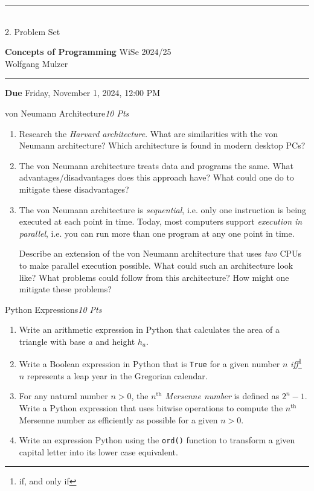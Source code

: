 \documentclass[a4paper,twoside,12pt]{article}
\newcommand{\ZETTELNUMMER}{2}
\newcommand{\ABGABEDATUM}{Friday, November 1, 2024, 12:00 PM}
\newcounter{AUFGNR}
\newcommand{\AUFGABE}[2]{\vspace{0.3cm}\item[Problem \arabic{AUFGNR}]\stepcounter{AUFGNR} #1\hfill\emph{#2}}
\begin{document}
\pagestyle{empty}
\hrule\medskip
\rule{0ex}{0ex}\\[-1ex]
\ZETTELNUMMER. Problem Set

\smallskip
\noindent
\large
\textbf{Concepts of Programming}\hfill 
WiSe 2024/25 \\[0.5ex]
\normalsize
Wolfgang Mulzer

\medskip\hrule

\smallskip
\noindent
\textbf{Due} \ABGABEDATUM

\vskip 0.5cm

\begin{description}

		\AUFGABE{von Neumann Architecture}{10 Pts}
\begin{enumerate}

\item Research the \emph{Harvard architecture}. What are similarities with the von Neumann architecture? Which architecture is found in modern desktop PCs?
\item The von Neumann architecture treats data and programs the same. What advantages/disadvantages does this approach have? What could one do to mitigate these disadvantages?
\item The von Neumann architecture is \emph{sequential}, i.e. only one instruction is being executed at each point in time. Today, most computers support \emph{execution in parallel}, i.e. you can run more than one program at any one point in time.

Describe an extension of the von Neumann architecture that uses \emph{two} CPUs to make parallel execution possible. What could such an architecture look like? What problems could follow from this architecture? How might one mitigate these problems? 
\end{enumerate} 



\AUFGABE{Python Expressions}{10 Pts}
\begin{enumerate}
\item Write an arithmetic expression in Python that calculates the area of a triangle with base $a$ and height $h_a$.
\item Write a Boolean expression in Python that is \texttt{True} for a given number $n$ \textit{iff}\footnote{if, and only if} $n$ represents a leap year in the Gregorian calendar.
\item For any natural number $n > 0$, the \emph{$n^{\text{th}}$ Mersenne number} is defined as $2^n-1$. Write a Python expression that uses bitwise operations to compute the $n^\text{th}$ Mersenne number as efficiently as possible for a given $n>0$.
\item Write an expression Python using the \texttt{ord()} function to transform a given capital letter into its lower case equivalent.


\end{enumerate}
\end{description}
\end{document}
